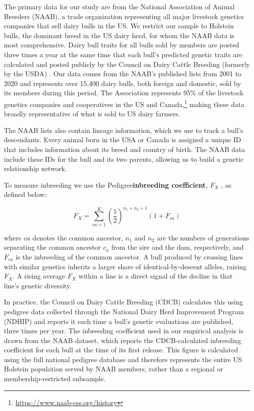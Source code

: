\documentclass[12pt,letterpaper]{article}
\begin{document}
The primary data for our study are from the National Association of Animal Breeders (NAAB), a trade organization representing all major livestock genetics companies that sell dairy bulls in the US. We restrict our sample to Holstein bulls, the dominant breed in the US dairy herd, for whom the NAAB data is most comprehensive. Dairy bull traits for all bulls sold by members are posted three times a year at the same time that each bull's predicted genetic traits are calculated and posted publicly by the Council on Dairy Cattle Breeding (formerly by the USDA) \citep{Hutchins_Hueth2023}. Our data comes from the NAAB's published lists from 2001 to 2020 and represents over 15,400 dairy bulls, both foreign and domestic, sold by its members during this period. The Association represents 95\% of the livestock genetics companies and cooperatives in the US and Canada,\footnote{\url{https://www.naab-css.org/history}} making these data broadly representative of what is sold to US dairy farmers.

The NAAB lists also contain lineage information, which we use to track a bull's descendants. Every animal born in the USA or Canada is assigned a unique ID that includes information about its breed and country of birth. The NAAB data include these IDs for the bull and its two parents, allowing us to build a genetic relationship network. 

To measure inbreeding we use the Pedigree\textbf{inbreeding coefficient}, $F_{X}$ \citep{Wright1922}, as defined below:

\begin{equation}
        F_{X}=\sum_{ca=1}^{K}\left(\dfrac{1}{2}\right)^{n_{1}+n_{2}+1}(1+F_{ca})\label{eq:inb}
\end{equation}

where $ca$ denotes the common ancestor, $n_{1}$ and $n_{2}$ are the numbers of generations separating the common ancestor $c_a$ from the sire and the dam, respectively, and $F_{ca}$ is the inbreeding of the common ancestor. 
A bull produced by crossing lines with similar genetics inherits a larger share of identical-by-descent alleles, raising $F_{X}$.
A rising average $F_{X}$ within a line is a direct signal of the decline in that line's genetic diversity.

In practice, the Council on Dairy Cattle Breeding (CDCB) calculates this using pedigree data collected through the National Dairy Herd Improvement Program (NDHIP) and reports it each time a bull's genetic evaluations are published, three times per year. The inbreeding coefficient used in our empirical analysis is drawn from the NAAB dataset, which reports the CDCB-calculated inbreeding coefficient for each bull at the time of its first release. This figure is calculated using the full national pedigree database and therefore represents the entire US Holstein population served by NAAB members, rather than a regional or membership-restricted subsample.
\end{document}
